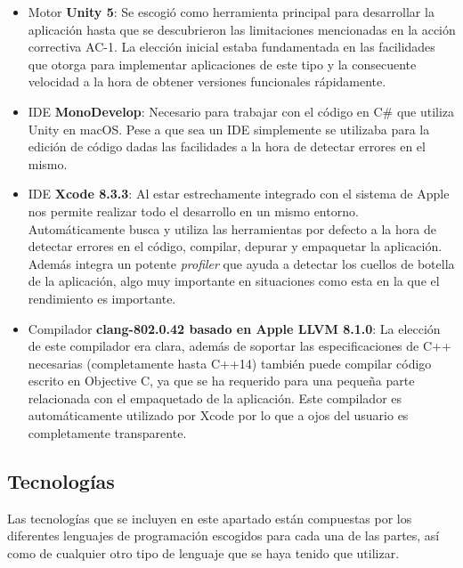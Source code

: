 \begin{itemize}
	\item Motor \textbf{Unity 5}: Se escogió como herramienta principal para desarrollar la aplicación hasta que se descubrieron las limitaciones mencionadas en la acción correctiva AC-1. La elección inicial estaba fundamentada en las facilidades que otorga para implementar aplicaciones de este tipo y la consecuente velocidad a la hora de obtener versiones funcionales rápidamente.
	\item IDE \textbf{MonoDevelop}: Necesario para trabajar con el código en C\# que utiliza Unity en macOS. Pese a que sea un IDE simplemente se utilizaba para la edición de código dadas las facilidades a la hora de detectar errores en el mismo.
	\item IDE \textbf{Xcode 8.3.3}: Al estar estrechamente integrado con el sistema de Apple nos permite realizar todo el desarrollo en un mismo entorno. Automáticamente busca y utiliza las herramientas por defecto a la hora de detectar errores en el código, compilar, depurar y empaquetar la aplicación. Además integra un potente \textit{profiler} que ayuda a detectar los cuellos de botella de la aplicación, algo muy importante en situaciones como esta en la que el rendimiento es importante.
	\item Compilador \textbf{clang-802.0.42 basado en Apple LLVM 8.1.0}: La elección de este compilador era clara, además de soportar las especificaciones de C++ necesarias (completamente hasta C++14) también puede compilar código escrito en Objective C, ya que se ha requerido para una pequeña parte relacionada con el empaquetado de la aplicación. Este compilador es automáticamente utilizado por Xcode por lo que a ojos del usuario es completamente transparente.
\end{itemize}

\subsection{Tecnologías}

Las tecnologías que se incluyen en este apartado están compuestas por los diferentes lenguajes de programación escogidos para cada una de las partes, así como de cualquier otro tipo de lenguaje que se haya tenido que utilizar.

